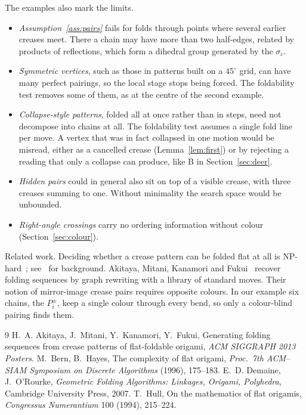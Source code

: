 \documentclass[11pt]{article}
\theoremstyle{definition}
\theoremstyle{remark}
\begin{document}
The examples also mark the limits.
\begin{itemize}
\item \emph{Assumption~\ref{ass:pairs}} fails for folds through points where several earlier creases meet. There a chain may have more than two half-edges, related by products of reflections, which form a dihedral group generated by the $\sigma_c$.
\item \emph{Symmetric vertices}, such as those in patterns built on a $45^\circ$ grid, can have many perfect pairings, so the local stage stops being forced. The foldability test removes some of them, as at the centre of the second example.
\item \emph{Collapse-style patterns}, folded all at once rather than in steps, need not decompose into chains at all. The foldability test assumes a single fold line per move. A vertex that was in fact collapsed in one motion would be misread, either as a cancelled crease (Lemma~\ref{lem:first}) or by rejecting a reading that only a collapse can produce, like B in Section~\ref{sec:deer}.
\item \emph{Hidden pairs} could in general also sit on top of a visible crease, with three creases summing to one. Without minimality the search space would be unbounded.
\item \emph{Right-angle crossings} carry no ordering information without colour (Section~\ref{sec:colour}).
\end{itemize}

Related work. Deciding whether a crease pattern can be folded flat at all is NP-hard~\cite{bernhayes}; see~\cite{demaine} for background. Akitaya, Mitani, Kanamori and Fukui~\cite{akitaya} recover folding sequences by graph rewriting with a library of standard moves. Their notion of mirror-image crease pairs requires opposite colours. In our example six chains, the $P_i^{\pm}$, keep a single colour through every bend, so only a colour-blind pairing finds them.

\begin{thebibliography}{9}
 H.~A. Akitaya, J.~Mitani, Y.~Kanamori, Y.~Fukui, Generating folding sequences from crease patterns of flat-foldable origami, \emph{ACM SIGGRAPH 2013 Posters}.
 M.~Bern, B.~Hayes, The complexity of flat origami, \emph{Proc.\ 7th ACM--SIAM Symposium on Discrete Algorithms} (1996), 175--183.
 E.~D. Demaine, J.~O'Rourke, \emph{Geometric Folding Algorithms: Linkages, Origami, Polyhedra}, Cambridge University Press, 2007.
 T.~Hull, On the mathematics of flat origamis, \emph{Congressus Numerantium} 100 (1994), 215--224.
\end{thebibliography}
\end{document}
